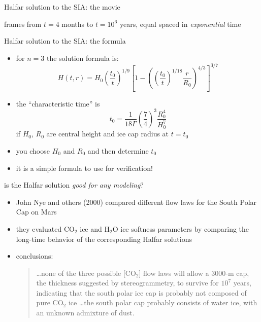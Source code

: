 \begin{frame}{Halfar solution to the SIA: the movie}
\label{slide:plothalfar}


\par
\scriptsize 
frames from $t=4$ months to $t = 10^6$ years, equal spaced in \emph{exponential} time
\end{frame}


\begin{frame}{Halfar solution to the SIA: the formula}

\begin{itemize}
\item for $n=3$ the solution formula is:
  $$H(t,r) = H_0 \left(\frac{t_0}{t}\right)^{1/9} \left[1 - \left(\left(\frac{t_0}{t}\right)^{1/18} \frac{r}{R_0}\right)^{4/3}\right]^{3/7}$$
\item the ``characteristic time'' is
  $$t_0 = \frac{1}{18 \Gamma} \left(\frac{7}{4}\right)^3 \frac{R_0^4}{H_0^{7}}$$
if $H_0$, $R_0$ are central height and ice cap radius at $t=t_0$
\item you choose $H_0$ and $R_0$ and then determine $t_0$
\item it is a simple formula to use for verification!
\end{itemize}
\end{frame}


\begin{frame}{is the Halfar solution \emph{good for any modeling}?}

\begin{itemize}
\item John Nye and others (2000)\nocite{NyeIcarus2000} compared different flow laws for the South Polar Cap on Mars
\item they evaluated $\text{CO}_2$ ice and $\text{H}_2\text{O}$ ice softness parameters by comparing the long-time behavior of the corresponding Halfar solutions
\item conclusions:
  \begin{quote}
  \dots none of the three possible [$\text{CO}_2$] flow laws will allow a 3000-m cap, the thickness suggested by stereogrammetry, to survive for $10^7$ years, indicating that the south polar ice cap is probably not composed of pure $\text{CO}_2$ ice \dots the south polar cap probably consists of water ice, with an unknown admixture of dust.
  \end{quote}
\end{itemize}

\end{frame}


